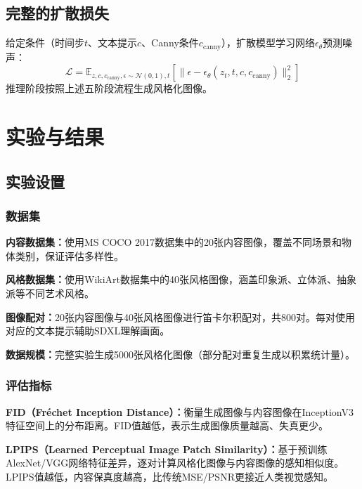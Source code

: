 \documentclass[twocolumn,a4paper,11pt]{ctexart}
\begin{document}
\subsection{完整的扩散损失}

给定条件（时间步$t$、文本提示$c$、Canny条件$c_{\text{canny}}$），扩散模型学习网络$\epsilon_\theta$预测噪声：
\begin{equation}
\mathcal{L} = \mathbb{E}_{z, c, c_{\text{canny}}, \epsilon \sim \mathcal{N}(0,1), t} \left[ \|\epsilon - \epsilon_\theta(z_t, t, c, c_{\text{canny}})\|_2^2 \right] \label{eq:loss}
\end{equation}
推理阶段按照上述五阶段流程生成风格化图像。

\section{实验与结果}

\subsection{实验设置}

\subsubsection{数据集}

{\bfseries 内容数据集：}使用MS COCO 2017数据集中的20张内容图像，覆盖不同场景和物体类别，保证评估多样性。

{\bfseries 风格数据集：}使用WikiArt数据集中的40张风格图像，涵盖印象派、立体派、抽象派等不同艺术风格。

{\bfseries 图像配对：}20张内容图像与40张风格图像进行笛卡尔积配对，共800对。每对使用对应的文本提示辅助SDXL理解画面。

{\bfseries 数据规模：}完整实验生成5000张风格化图像（部分配对重复生成以积累统计量）。

\subsubsection{评估指标}

{\bfseries FID（Fr\'{e}chet Inception Distance）：}衡量生成图像与内容图像在InceptionV3特征空间上的分布距离。FID值越低，表示生成图像质量越高、失真更少。

{\bfseries LPIPS（Learned Perceptual Image Patch Similarity）：}基于预训练AlexNet/VGG网络特征差异，逐对计算风格化图像与内容图像的感知相似度。LPIPS值越低，内容保真度越高，比传统MSE/PSNR更接近人类视觉感知。
\end{document}
